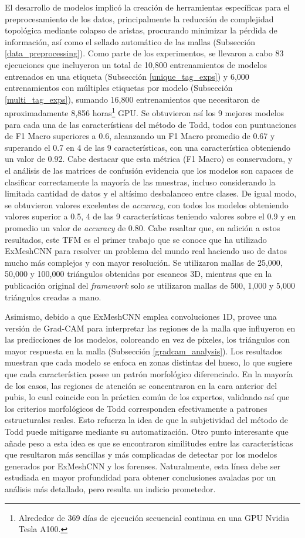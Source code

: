El desarrollo de modelos implicó la creación de herramientas específicas para el preprocesamiento de los datos, principalmente la reducción de complejidad topológica mediante colapso de aristas, procurando minimizar la pérdida de información, así como el sellado automático de las mallas (Subsección \ref{data_preprocessing}). Como parte de los experimentos, se llevaron a cabo 83 ejecuciones que incluyeron un total de 10,800 entrenamientos de modelos entrenados en una etiqueta (Subsección \ref{unique_tag_exps}) y 6,000 entrenamientos con múltiples etiquetas por modelo (Subsección \ref{multi_tag_exps}), sumando 16,800 entrenamientos que necesitaron de aproximadamente 8,856 horas\footnote{Alrededor de 369 días de ejecución secuencial continua en una GPU Nvidia Tesla A100.} GPU\cite{englewood_understanding_2025}. Se obtuvieron así los 9 mejores modelos para cada una de las características del método de Todd, todos con puntuaciones de F1 Macro superiores a 0.6, alcanzando un F1 Macro promedio de 0.67 y superando el 0.7 en 4 de las 9 características, con una característica obteniendo un valor de 0.92. Cabe destacar que esta métrica (F1 Macro) es conservadora, y el análisis de las matrices de confusión evidencia que los modelos son capaces de clasificar correctamente la mayoría de las muestras, incluso considerando la limitada cantidad de datos y el altísimo desbalanceo entre clases. De igual modo, se obtuvieron valores excelentes de \textit{accuracy}, con todos los modelos obteniendo valores superior a 0.5, 4 de las 9 características teniendo valores sobre el 0.9 y en promedio un valor de \textit{accuracy} de 0.80. Cabe resaltar que, en adición a estos resultados, este TFM es el primer trabajo que se conoce que ha utilizado ExMeshCNN para resolver un problema del mundo real haciendo uso de datos mucho más complejos y con mayor resolución. Se utilizaron mallas de 25,000, 50,000 y 100,000 triángulos obtenidas por escaneos 3D, mientras que en la publicación original del \textit{framework} solo se utilizaron mallas de 500, 1,000 y 5,000 triángulos creadas a mano.

Asimismo, debido a que ExMeshCNN emplea convoluciones 1D, provee una versión de Grad-CAM para interpretar las regiones de la malla que influyeron en las predicciones de los modelos, coloreando en vez de píxeles, los triángulos con mayor respuesta en la malla (Subsección \ref{gradcam_analysis}). Los resultados muestran que cada modelo se enfoca en zonas distintas del hueso, lo que sugiere que cada característica posee un patrón morfológico diferenciado. En la mayoría de los casos, las regiones de atención se concentraron en la cara anterior del pubis, lo cual coincide con la práctica común de los expertos, validando así que los criterios morfológicos de Todd corresponden efectivamente a patrones estructurales reales. Esto refuerza la idea de que la subjetividad del método de Todd puede mitigarse mediante su automatización. Otro punto interesante que añade peso a esta idea es que se encontraron similitudes entre las características que resultaron más sencillas y más complicadas de detectar por los modelos generados por ExMeshCNN y los forenses. Naturalmente, esta línea debe ser estudiada en mayor profundidad para obtener conclusiones avaladas por un análisis más detallado, pero resulta un indicio prometedor.

